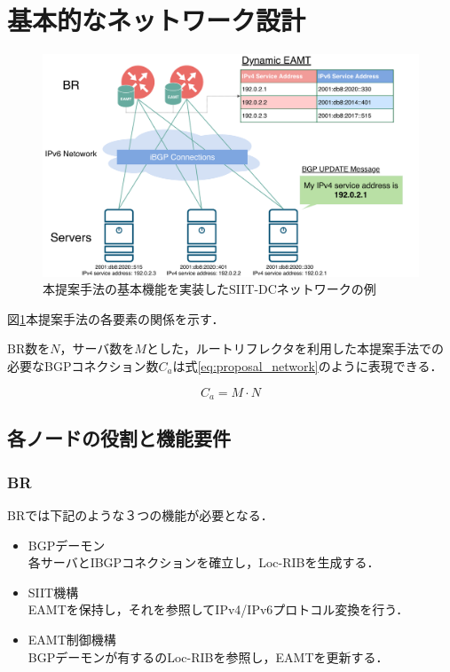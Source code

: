 {\section{基本的なネットワーク設計}
\label{proposal:network}
\begin{figure}[h]
    \begin{center}
    \includegraphics[width=15cm,pagebox=cropbox,clip]{img/proposal_method_network.pdf}
    \end{center}
    \caption{本提案手法の基本機能を実装したSIIT-DCネットワークの例}
    \label{fig:proposal_method_network}
\end{figure}


図\ref{fig:proposal_method_network}本提案手法の各要素の関係を示す．

BR数を$N$，サーバ数を$M$とした，ルートリフレクタを利用した本提案手法での必要なBGPコネクション数$C_a$は式\ref{eq:proposal_network}のように表現できる．

\begin{equation}
    \label{eq:proposal_network}
    C_a = M \cdot N
\end{equation}


\subsection{各ノードの役割と機能要件}
\label{proposal:network:nodes}
\subsubsection{BR}
BRでは下記のような３つの機能が必要となる．
\begin{itemize}
    \item BGPデーモン\\
    各サーバとIBGPコネクションを確立し，Loc-RIBを生成する．
    \item SIIT機構\\
    EAMTを保持し，それを参照してIPv4/IPv6プロトコル変換を行う．
    \item EAMT制御機構\\
    BGPデーモンが有するのLoc-RIBを参照し，EAMTを更新する．
\end{itemize}

}
